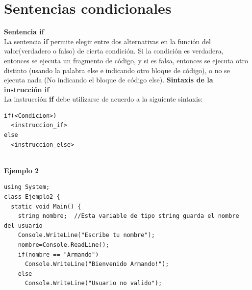 \documentclass[12pt,a4paper]{report}
\begin{document}
{\section{Sentencias condicionales}
\textbf{Sentencia if}\\La sentencia \textbf{if} permite elegir entre dos alternativas en la función del valor(verdadero o falso) de cierta condición. Si la condición es verdadera, entonces se ejecuta un fragmento de código, y si es falsa, entonces se ejecuta otro distinto (usando la palabra else e indicando otro bloque de código), o no se ejecuta nada (No indicando el bloque de código else).
\textbf{Sintaxis de la instrucción if}\\La instrucción \textbf{if} debe utilizarse de acuerdo a la siguiente sintaxis:\\
\begin{lstlisting}
if(<Condicion>)
  <instruccion_if>
else
  <instruccion_else>
\end{lstlisting}
\\\textbf{Ejemplo 2}\\
\begin{lstlisting}
using System;
class Ejemplo2 {
  static void Main() {
    string nombre;  //Esta variable de tipo string guarda el nombre del usuario
    Console.WriteLine("Escribe tu nombre");
    nombre=Console.ReadLine();
    if(nombre == "Armando")
      Console.WriteLine("Bienvenido Armando!");
    else
      Console.WriteLine("Usuario no valido");   


\end{lstlisting}}
\end{document}
